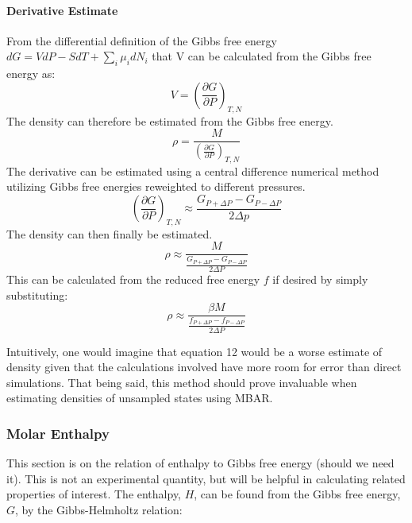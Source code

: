 \documentclass[aps,pre,twocolumn,nofootinbib,superscriptaddress,linenumbers,10pt, draft,tightenlines]{revtex4-1}
\begin{document}
\paragraph{Derivative Estimate}
 From the differential definition of the Gibbs free energy $dG = VdP -SdT + \sum_i \mu_i dN_i$ that V can be calculated from the Gibbs free energy as:
\begin{equation} V = \left( \frac{\partial G}{\partial P} \right)_{T,N} \end{equation}
 The density can therefore be estimated from the Gibbs free energy.
\begin{equation} \rho = \frac{M}{ \left( \frac{\partial G}{\partial P} \right)_{T,N}} \end{equation}
 The derivative can be estimated using a central difference numerical method utilizing Gibbs free energies reweighted to different pressures.
\begin{equation} \left( \frac{\partial G}{\partial P} \right)_{T,N} \approx \frac{G_{P + \Delta P} - G_{P-\Delta P}}{2\Delta p} \end{equation}
 The density can then finally be estimated.
\begin{equation} \rho \approx \frac{M}{\frac{G_{P + \Delta P} - G_{P-\Delta P}}{2\Delta P}} \end{equation}
This can be calculated from the reduced free energy $f$ if desired by simply substituting:
\begin{equation} \rho \approx \frac{\beta M}{\frac{f_{P + \Delta P} - f_{P-\Delta P}}{2\Delta P}} \end{equation}

Intuitively, one would imagine that equation 12 would be a worse estimate of density given that the calculations involved have more room for error than direct simulations. That being said, this method should prove invaluable when estimating densities of unsampled states using MBAR. 


\subsubsection{Molar Enthalpy}
This section is on the relation of enthalpy to Gibbs free energy (should we need it). This is not an experimental quantity, but will be helpful in calculating related properties of interest. The enthalpy, $H$, can be found from the Gibbs free energy, $G$, by the Gibbs-Helmholtz relation: 
\end{document}
